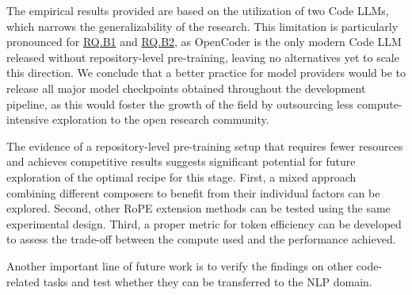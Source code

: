 The empirical results provided are based on the utilization of two Code LLMs, which narrows the generalizability of the research. This limitation is particularly pronounced for \hyperref[rq:rq-b1]{RQ.B1} and \hyperref[rq:rq-b2]{RQ.B2}, as OpenCoder is the only modern Code LLM released without repository-level pre-training, leaving no alternatives yet to scale this direction. We conclude that a better practice for model providers would be to release all major model checkpoints obtained throughout the development pipeline, as this would foster the growth of the field by outsourcing less compute-intensive exploration to the open research community.

The evidence of a repository-level pre-training setup that requires fewer resources and achieves competitive results suggests significant potential for future exploration of the optimal recipe for this stage. First, a mixed approach combining different composers to benefit from their individual factors can be explored. Second, other RoPE extension methods can be tested using the same experimental design. Third, a proper metric for token efficiency can be developed to assess the trade-off between the compute used and the performance achieved.

Another important line of future work is to verify the findings on other code-related tasks and test whether they can be transferred to the NLP domain.
